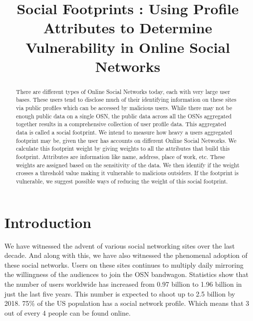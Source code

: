 \documentclass[conference]{IEEEtran}
\begin{document}
\title{Social Footprints : Using Profile Attributes to Determine Vulnerability in Online Social Networks}

\author{
}

\maketitle

\begin{abstract}
There are different types of Online Social Networks today, each with very large user bases. These users tend to disclose much of their identifying information on these sites via public profiles which can be accessed by malicious users. While there may not be enough public data on a single OSN, the public data across all the OSNs aggregated together results in a comprehensive collection of user profile data. This aggregated data is called a social footprint. We intend to measure how heavy a users aggregated footprint may be, given the user has accounts on different Online Social Networks. We calculate this footprint weight by giving weights to all the attributes that build this footprint. Attributes are information like name, address, place of work, etc. These weights are assigned based on the sensitivity of the data. We then identify if the weight crosses a threshold value making it vulnerable to malicious outsiders. If the footprint is vulnerable, we suggest possible ways of reducing the weight of this social footprint.
\end{abstract}


\section{Introduction}
We have witnessed the advent of various social networking sites over the last decade. And along with this, we have also witnessed the phenomenal adoption of these social networks. Users on these sites continues to multiply daily mirroring the willingness of the audiences to join the OSN bandwagon. Statistics show\cite{statswebsite} that the number of users worldwide has increased from 0.97 billion to 1.96 billion in just the last five years. This number is expected to shoot up to 2.5 billion by 2018. 75\% of the US population has a social network profile. Which means that 3 out of every 4 people can be found online.\\
\end{document}
